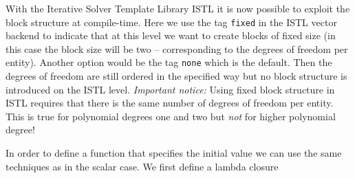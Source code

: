 \documentclass[a4paper,12pt]{article}
\theoremstyle{definition}
\theoremstyle{definition}
\begin{document}
With the Iterative Solver Template Library ISTL it is now
possible to exploit the block structure at compile-time.
Here we use the tag \lstinline{fixed} in the ISTL vector backend to indicate
that at this level we want to create blocks of fixed size (in this case the block size will be two --
corresponding to the degrees of freedom per entity). Another option
would be the tag \lstinline{none} which is the default. Then the degrees
of freedom are still ordered in the specified way but no block structure is
introduced on the ISTL level. \textit{Important notice:} Using fixed block
structure in ISTL requires that there is the same number of degrees of freedom
per entity. This is true for polynomial degrees one and two but \textit{not}
for higher polynomial degree!

In order to define a function that specifies the initial value we can
use the same techniques as in the scalar case. We first define a lambda
closure
% 
% 

% 

% 

% 
\end{document}

